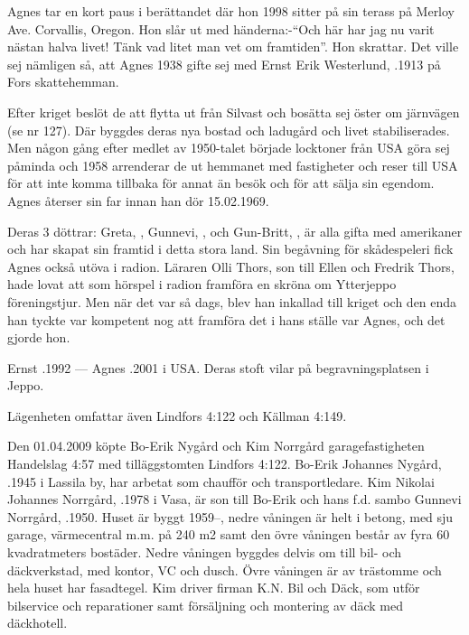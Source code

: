 Agnes tar en kort paus i berättandet där hon 1998 sitter på sin terass på Merloy Ave. Corvallis, Oregon. Hon slår ut med händerna:-``Och här har jag nu varit nästan halva livet! Tänk vad litet man vet om framtiden''. Hon skrattar. Det ville sej nämligen så, att Agnes 1938 gifte sej med Ernst Erik Westerlund, .1913 på Fors skattehemman.

Efter kriget beslöt de att flytta ut från Silvast och bosätta sej öster om järnvägen (se nr 127). Där byggdes deras nya bostad och ladugård och livet stabiliserades. Men någon gång efter medlet av 1950-talet började locktoner från USA göra sej påminda och 1958 arrenderar de ut hemmanet med fastigheter och reser till USA för att inte komma tillbaka för annat än besök och för att sälja sin egendom. Agnes återser sin far innan han dör 15.02.1969.

Deras 3 döttrar: Greta, , Gunnevi, , och Gun-Britt, , är alla gifta med amerikaner och har skapat sin framtid i detta stora land. Sin begåvning för skådespeleri fick Agnes också utöva i radion. Läraren Olli Thors, son till Ellen och Fredrik Thors, hade lovat att som hörspel i radion framföra en skröna om Ytterjeppo föreningstjur. Men när det var så dags, blev han inkallad till kriget och den enda han tyckte var kompetent nog att framföra det i hans ställe var Agnes, och det gjorde hon.

Ernst .1992  ---  Agnes .2001 i USA. Deras stoft vilar på begravningsplatsen i Jeppo.




Lägenheten omfattar även Lindfors 4:122 och Källman 4:149.



Den 01.04.2009 köpte Bo-Erik Nygård och Kim Norrgård garagefastigheten Handelslag 4:57 med tilläggstomten Lindfors 4:122. Bo-Erik Johannes Nygård, .1945 i Lassila by, har arbetat som chaufför och transportledare. Kim Nikolai Johannes Norrgård, .1978 i Vasa, är son till Bo-Erik och hans f.d. sambo Gunnevi Norrgård, .1950. Huset är byggt 1959--, nedre våningen är helt i betong, med sju garage, värmecentral m.m. på 240 m2 samt den övre våningen består av fyra 60 kvadratmeters bostäder. Nedre våningen byggdes delvis om till bil- och däckverkstad, med kontor, VC och dusch. Övre våningen är av trästomme och hela huset har fasadtegel. Kim driver firman K.N. Bil och Däck, som utför bilservice och reparationer samt försäljning och montering av däck med däckhotell.

